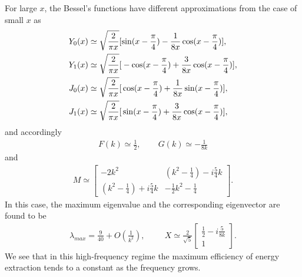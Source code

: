 For large $x$, the Bessel's functions have different approximations from the case of small $x$ as
\begin{align}
Y_0(x) & \simeq  \sqrt{\frac{2}{\pi x}} [ \sin (x-\frac{\pi}{4}) - \frac{1}{8x} \cos (x - \frac{\pi}{4}) ], \\
Y_1(x) & \simeq  \sqrt{\frac{2}{\pi x}} \large{[} -\cos (x-\frac{\pi}{4})+\frac{3}{8x} \cos (x - \frac{\pi}{4}) \large{]}, \\
J_0(x) & \simeq  \sqrt{\frac{2}{\pi x}} \large{[} \cos (x-\frac{\pi}{4}) + \frac{1}{8x} \sin (x - \frac{\pi}{4}) \large{]}, \\
J_1(x) & \simeq  \sqrt{\frac{2}{\pi x}} \large{[} \sin (x-\frac{\pi}{4}) + \frac{3}{8x} \cos (x - \frac{\pi}{4}) \large{]},
\end{align}
and accordingly
\begin{align}
F(k) \simeq \frac{1}{2},   \hspace{25pt}  G(k) \simeq -\frac{1}{8k}
\end{align}
and
\begin{align}
M \simeq \begin{bmatrix}   -2k^2   &  (k^2 - \frac{1}{4}) - i\frac{5}{4}k  \\
                        (k^2 - \frac{1}{4}) + i\frac{5}{4}k &   -\frac{1}{2}k^2 - \frac{1}{4}  \end{bmatrix}.
\end{align}
In this case, the maximum eigenvalue and the corresponding eigenvector are found to be
\begin{align}
\lambda_{max} = \frac{9}{40} + O(\frac{1}{k^2}), \hspace{1cm}
X \simeq \frac{2}{\sqrt{5}}
\begin{bmatrix} \frac{1}{2} - i \frac{5}{8k}   \\     1     \end{bmatrix}.
\end{align}
We see that in this high-frequency regime the maximum efficiency of energy extraction tends to a constant as the frequency grows.



